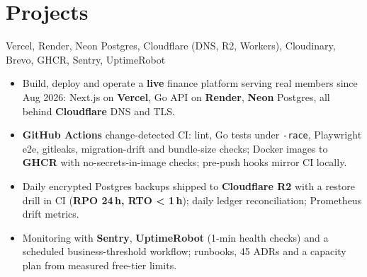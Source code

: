 \documentclass[10pt,a4paper]{article}
\begin{document}
\section{Projects}
{ \textbar{} }
{Vercel, Render, Neon Postgres, Cloudflare (DNS, R2, Workers), Cloudinary, Brevo, GHCR, Sentry, UptimeRobot}
{\begin{itemize}
  \item Build, deploy and operate a \textbf{live} finance platform serving real members since Aug 2026: Next.js on \textbf{Vercel}, Go API on \textbf{Render}, \textbf{Neon} Postgres, all behind \textbf{Cloudflare} DNS and TLS.
  \item \textbf{GitHub Actions} change-detected CI: lint, Go tests under \texttt{-race}, Playwright e2e, gitleaks, migration-drift and bundle-size checks; Docker images to \textbf{GHCR} with no-secrets-in-image checks; pre-push hooks mirror CI locally.
  \item Daily encrypted Postgres backups shipped to \textbf{Cloudflare R2} with a restore drill in CI (\textbf{RPO 24\,h, RTO \textless{} 1\,h}); daily ledger reconciliation; Prometheus drift metrics.
  \item Monitoring with \textbf{Sentry}, \textbf{UptimeRobot} (1-min health checks) and a scheduled business-threshold workflow; runbooks, 45 ADRs and a capacity plan from measured free-tier limits.
\end{itemize}}












\end{document}
